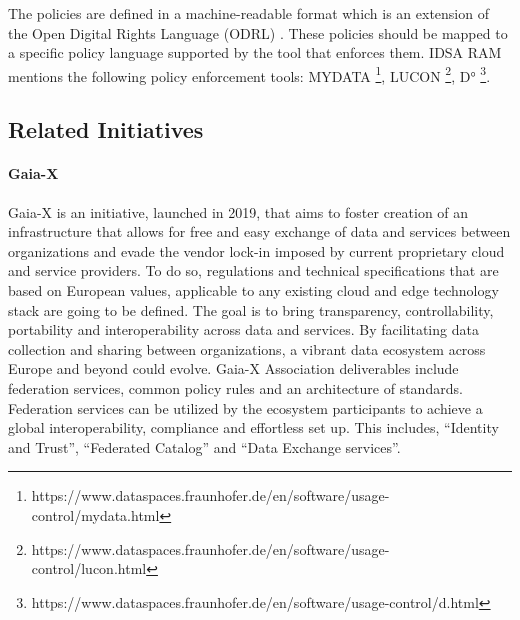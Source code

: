 The policies are defined in a machine-readable format which is an extension of the Open Digital Rights Language (ODRL) \cite{eitel_usage_2021}. These policies should be mapped to a specific policy language supported by the tool that enforces them. IDSA RAM mentions the following policy enforcement tools: MYDATA \footnote{https://www.dataspaces.fraunhofer.de/en/software/usage-control/mydata.html}, LUCON \footnote{https://www.dataspaces.fraunhofer.de/en/software/usage-control/lucon.html}, D° \footnote{https://www.dataspaces.fraunhofer.de/en/software/usage-control/d.html}. 

\subsection{Related Initiatives}
\paragraph{Gaia-X}

Gaia-X is an initiative, launched in 2019, that aims to foster creation of an infrastructure that allows for free and easy exchange of data and services between organizations and evade the vendor lock-in imposed by current proprietary cloud and service providers. To do so, regulations and technical specifications that are based on European values, applicable to any existing cloud and edge technology stack are going to be defined. The goal is to bring transparency, controllability, portability and interoperability across data and services. By facilitating data collection and sharing between organizations, a vibrant data ecosystem across Europe and beyond could evolve. Gaia-X Association deliverables include federation services, common policy rules and an architecture of standards. Federation services can be utilized by the ecosystem participants to achieve a global interoperability, compliance and effortless set up. This includes, “Identity and Trust”, “Federated Catalog” and “Data Exchange services”. \cite{otto_role_2022}




